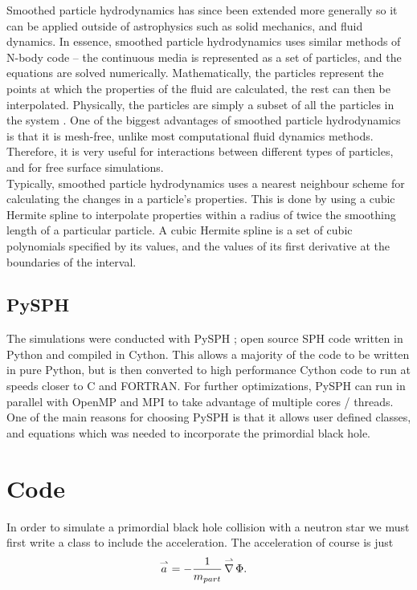 Smoothed particle hydrodynamics has since been extended more generally so it can be applied outside of astrophysics such as solid mechanics, and fluid dynamics. In essence, smoothed particle hydrodynamics uses similar methods of N-body code -- the continuous media is represented as a set of particles, and the equations are solved numerically. Mathematically, the particles represent the points at which the properties of the fluid are calculated, the rest can then be interpolated. Physically, the particles are simply a subset of all the particles in the system \cite{newsph}. One of the biggest advantages of smoothed particle hydrodynamics is that it is mesh-free, unlike most computational fluid dynamics methods. Therefore, it is very useful for interactions between different types of particles, and for free surface simulations. \\

Typically, smoothed particle hydrodynamics uses a nearest neighbour scheme for calculating the changes in a particle's properties. This is done by using a cubic Hermite spline to interpolate properties within a radius of twice the smoothing length of a particular particle. A cubic Hermite spline is a set of cubic polynomials specified by its values, and the values of its first derivative at the boundaries of the interval.

\subsection{PySPH}
The simulations were conducted with PySPH \cite{pysph}; open source SPH code written in Python and compiled in Cython. This allows a majority of the code to be written in pure Python, but is then converted to high performance Cython code to run at speeds closer to C and FORTRAN. For further optimizations, PySPH can run in parallel with OpenMP and MPI to take advantage of multiple cores / threads. One of the main reasons for choosing PySPH is that it allows user defined classes, and equations which was needed to incorporate the primordial black hole.

\section{Code}

In order to simulate a primordial black hole collision with a neutron star we must first write a class to include the acceleration. The acceleration of course is just
\begin{align*}
\overset{\rightharpoonup}a &= - \frac{1}{m_{part}} \operatorname{\overset{\rightharpoonup}\nabla} \Phi.
\end{align*}

